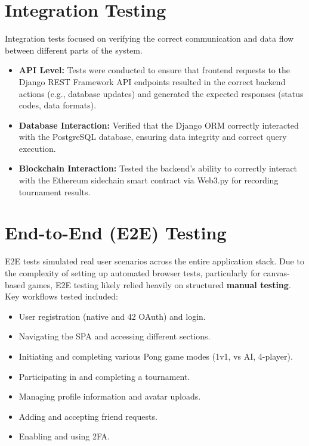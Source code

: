 \section{Integration Testing}
\label{sec:integration_testing}
Integration tests focused on verifying the correct communication and data flow between different parts of the system.
\begin{itemize}
    \item \textbf{API Level:} Tests were conducted to ensure that frontend requests to the Django REST Framework API endpoints resulted in the correct backend actions (e.g., database updates) and generated the expected responses (status codes, data formats).
    \item \textbf{Database Interaction:} Verified that the Django ORM correctly interacted with the PostgreSQL database, ensuring data integrity and correct query execution.
    \item \textbf{Blockchain Interaction:} Tested the backend's ability to correctly interact with the Ethereum sidechain smart contract via Web3.py for recording tournament results.
\end{itemize}

\section{End-to-End (E2E) Testing}
\label{sec:e2e_testing}
E2E tests simulated real user scenarios across the entire application stack. Due to the complexity of setting up automated browser tests, particularly for canvas-based games, E2E testing likely relied heavily on structured \textbf{manual testing}. Key workflows tested included:
\begin{itemize}
    \item User registration (native and 42 OAuth) and login.
    \item Navigating the SPA and accessing different sections.
    \item Initiating and completing various Pong game modes (1v1, vs AI, 4-player).
    \item Participating in and completing a tournament.
    \item Managing profile information and avatar uploads.
    \item Adding and accepting friend requests.
    \item Enabling and using 2FA.
\end{itemize}


